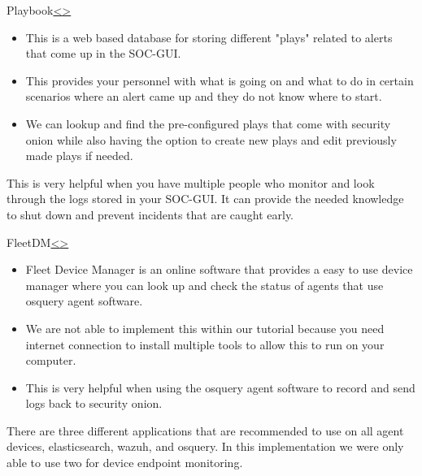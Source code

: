 \documentclass[12pt]{article}
\newenvironment{instructionblock}{\Large\bgroup}{\egroup}
\newcommand{\bi}{\begin{itemize}}
\newcommand{\ei}{\end{itemize}}
\begin{document}
\begin{slide}{Playbook}{\hyperref[slide 13]{\textless}\hyperref[slide 15]{\textgreater}}
	\begin{instructionblock}
        \bi
		\item This is a web based database for storing different "plays" related to alerts that come up in the SOC-GUI.
        \item This provides your personnel with what is going on and what to do in certain scenarios where an alert came up and they do not know where to start.
        \item We can lookup and find the pre-configured plays that come with security onion while also having the option to create new plays and edit previously made plays if needed.
		\ei
	\end{instructionblock}
\end{slide}

\vfill

This is very helpful when you have multiple people who monitor and look through the logs stored in your SOC-GUI. It can provide the needed knowledge to shut down and prevent incidents that are caught early.


\pagebreak
\begin{slide}{FleetDM}{\hyperref[slide 14]{\textless}\hyperref[slide 16]{\textgreater}}
	\begin{instructionblock}
		\bi
			\item Fleet Device Manager is an online software that provides a easy to use device manager where you can look up and check the status of agents that use osquery agent software.
			\item We are not able to implement this within our tutorial because you need internet connection to install multiple tools to allow this to run on your computer.
            \item This is very helpful when using the osquery agent software to record and send logs back to security onion.
		\ei
		
	\end{instructionblock}
\end{slide}

\vfill

There are three different applications that are recommended to use on all agent devices, elasticsearch, wazuh, and osquery. In this implementation we were only able to use two for device endpoint monitoring.
\end{document}
